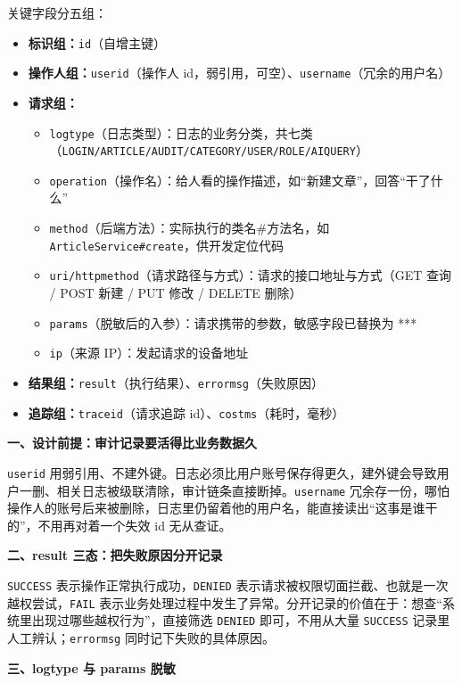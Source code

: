 \documentclass[zihao=-4,UTF8,openany]{ctexart}
\renewcommand{\_}{\textunderscore\allowbreak}
\begin{document}
关键字段分五组：

\begin{itemize}
\item \textbf{标识组：}\texttt{id}（自增主键）
\item \textbf{操作人组：}\texttt{user\_id}（操作人 id，弱引用，可空）、\texttt{username}（冗余的用户名）
\item \textbf{请求组：}
  \begin{itemize}
  \item \texttt{log\_type}（日志类型）：日志的业务分类，共七类（\texttt{LOGIN/ARTICLE/AUDIT/CATEGORY/USER/ROLE/AI\_QUERY}）
  \item \texttt{operation}（操作名）：给人看的操作描述，如“新建文章”，回答“干了什么”
  \item \texttt{method}（后端方法）：实际执行的类名\#方法名，如 \texttt{ArticleService\#create}，供开发定位代码
  \item \texttt{uri/http\_method}（请求路径与方式）：请求的接口地址与方式（GET 查询 / POST 新建 / PUT 修改 / DELETE 删除）
  \item \texttt{params}（脱敏后的入参）：请求携带的参数，敏感字段已替换为 ***
  \item \texttt{ip}（来源 IP）：发起请求的设备地址
  \end{itemize}
\item \textbf{结果组：}\texttt{result}（执行结果）、\texttt{error\_msg}（失败原因）
\item \textbf{追踪组：}\texttt{trace\_id}（请求追踪 id）、\texttt{cost\_ms}（耗时，毫秒）
\end{itemize}

\noindent\textbf{一、设计前提：审计记录要活得比业务数据久}

\texttt{user\_id} 用弱引用、不建外键。日志必须比用户账号保存得更久，建外键会导致用户一删、相关日志被级联清除，审计链条直接断掉。\texttt{username} 冗余存一份，哪怕操作人的账号后来被删除，日志里仍留着他的用户名，能直接读出“这事是谁干的”，不用再对着一个失效 id 无从查证。

\noindent\textbf{二、result 三态：把失败原因分开记录}

\texttt{SUCCESS} 表示操作正常执行成功，\texttt{DENIED} 表示请求被权限切面拦截、也就是一次越权尝试，\texttt{FAIL} 表示业务处理过程中发生了异常。分开记录的价值在于：想查“系统里出现过哪些越权行为”，直接筛选 \texttt{DENIED} 即可，不用从大量 \texttt{SUCCESS} 记录里人工辨认；\texttt{error\_msg} 同时记下失败的具体原因。

\noindent\textbf{三、log\_type 与 params 脱敏}
\end{document}
